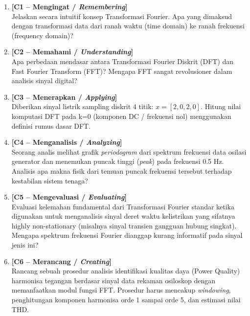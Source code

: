 \documentclass[11pt,a4paper]{article}
\begin{document}
\begin{enumerate}[leftmargin=1.8em, label=\textbf{Soal \arabic*.}]
    
    \item \textbf{[C1 -- Mengingat / \textit{Remembering}]} \\
    Jelaskan secara intuitif konsep Transformasi Fourier. Apa yang dimaksud dengan transformasi data dari ranah waktu (time domain) ke ranah frekuensi (frequency domain)?
    \vspace{2.2cm}

    \item \textbf{[C2 -- Memahami / \textit{Understanding}]} \\
    Apa perbedaan mendasar antara Transformasi Fourier Diskrit (DFT) dan Fast Fourier Transform (FFT)? Mengapa FFT sangat revolusioner dalam analisis sinyal digital?
    \vspace{2.8cm}

    \item \textbf{[C3 -- Menerapkan / \textit{Applying}]} \\
    Diberikan sinyal listrik sampling diskrit 4 titik: $x = [2, 0, 2, 0]$. Hitung nilai komputasi DFT pada k=0 (komponen DC / frekuensi nol) menggunakan definisi rumus dasar DFT.
    \vspace{2.8cm}

    \newpage

    \item \textbf{[C4 -- Menganalisis / \textit{Analyzing}]} \\
    Seorang analis melihat grafik \textit{periodogram} dari spektrum frekuensi data osilasi generator dan menemukan puncak tinggi (\textit{peak}) pada frekuensi 0.5 Hz. Analisis apa makna fisik dari temuan puncak frekuensi tersebut terhadap kestabilan sistem tenaga?
    \vspace{3.5cm}

    \item \textbf{[C5 -- Mengevaluasi / \textit{Evaluating}]} \\
    Evaluasi kelemahan fundamental dari Transformasi Fourier standar ketika digunakan untuk menganalisis sinyal deret waktu kelistrikan yang sifatnya highly non-stationary (misalnya sinyal transien gangguan hubung singkat). Mengapa spektrum frekuensi Fourier dianggap kurang informatif pada sinyal jenis ini?
    \vspace{3.5cm}

    \item \textbf{[C6 -- Merancang / \textit{Creating}]} \\
    Rancang sebuah prosedur analisis identifikasi kualitas daya (Power Quality) harmonisa tegangan berdasar sinyal data rekaman osiloskop dengan memanfaatkan modul fungsi FFT. Prosedur harus mencakup \textit{windowing}, penghitungan komponen harmonisa orde 1 sampai orde 5, dan estimasi nilai THD.
    \vspace{4.5cm}

\end{enumerate}
\end{document}
